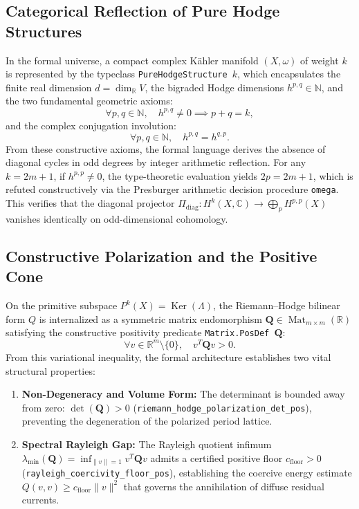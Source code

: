 \documentclass[11pt,a4paper]{article}
\theoremstyle{definition}
\theoremstyle{plain}
\DeclareMathOperator{\Ker}{Ker}
\begin{document}
\subsection{Categorical Reflection of Pure Hodge Structures}
In the formal universe, a compact complex Kähler manifold $(X, \omega)$ of weight $k$ is represented by the typeclass \texttt{PureHodgeStructure $k$}, which encapsulates the finite real dimension $d = \dim_\mathbb{R} V$, the bigraded Hodge dimensions $h^{p,q} \in \mathbb{N}$, and the two fundamental geometric axioms:
\begin{equation}
    \label{eq:formal_weight_sum}
    \forall p, q \in \mathbb{N}, \quad h^{p,q} \ne 0 \implies p + q = k,
\end{equation}
and the complex conjugation involution:
\begin{equation}
    \label{eq:formal_hodge_symmetry}
    \forall p, q \in \mathbb{N}, \quad h^{p,q} = h^{q,p}.
\end{equation}
From these constructive axioms, the formal language derives the absence of diagonal cycles in odd degrees by integer arithmetic reflection. For any $k = 2m + 1$, if $h^{p,p} \ne 0$, the type-theoretic evaluation yields $2p = 2m + 1$, which is refuted constructively via the Presburger arithmetic decision procedure \texttt{omega}. This verifies that the diagonal projector $\Pi_{\mathrm{diag}}: H^k(X, \mathbb{C}) \to \bigoplus_p H^{p,p}(X)$ vanishes identically on odd-dimensional cohomology.

\subsection{Constructive Polarization and the Positive Cone}
On the primitive subspace $P^k(X) = \Ker(\Lambda)$, the Riemann--Hodge bilinear form $Q$ is internalized as a symmetric matrix endomorphism $\mathbf{Q} \in \operatorname{Mat}_{m \times m}(\mathbb{R})$ satisfying the constructive positivity predicate \texttt{Matrix.PosDef $\mathbf{Q}$}:
\begin{equation}
    \label{eq:formal_posdef_predicate}
    \forall v \in \mathbb{R}^m \setminus \{0\}, \quad v^T \mathbf{Q} v > 0.
\end{equation}
From this variational inequality, the formal architecture establishes two vital structural properties:
\begin{enumerate}[label=(\roman*)]
    \item \textbf{Non-Degeneracy and Volume Form:} The determinant is bounded away from zero: $\det(\mathbf{Q}) > 0$ (\texttt{riemann\_hodge\_polarization\_det\_pos}), preventing the degeneration of the polarized period lattice.
    \item \textbf{Spectral Rayleigh Gap:} The Rayleigh quotient infimum $\lambda_{\min}(\mathbf{Q}) = \inf_{\|v\|=1} v^T \mathbf{Q} v$ admits a certified positive floor $c_{\mathrm{floor}} > 0$ (\texttt{rayleigh\_coercivity\_floor\_pos}), establishing the coercive energy estimate $Q(v, v) \ge c_{\mathrm{floor}} \|v\|^2$ that governs the annihilation of diffuse residual currents.
\end{enumerate}
\end{document}
